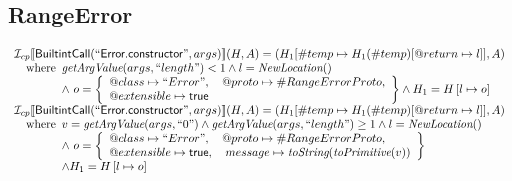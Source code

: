 \subsection{RangeError}
\[
\begin{array}{l}
\mathcal{I} _{cp}\llbracket \mbox{\textsf{BuiltintCall}}(``\mbox{\textsf{Error.constructor}}",args)\rrbracket(H,A)
  = (H_1[\#temp \mapsto H_1(\#temp)[@return \mapsto l]], A)\\
\quad{\rm where}\begin{array}[t]{l}
  \emph{getArgValue}(args, ``length") < 1 
  \land l=\emph{NewLocation}()\\
  \land\ o = \left\{\begin{array}{l}
    @class\mapsto ``Error", \quad
    @proto\mapsto \#RangeErrorProto,\\
    @extensible\mapsto \mbox{\textsf{true}}
    \end{array}\right\}
  \land H_1=H\left[l\mapsto o\right]\\
  \end{array}\\
  
\mathcal{I} _{cp}\llbracket \mbox{\textsf{BuiltintCall}}(``\mbox{\textsf{Error.constructor}}",args)\rrbracket(H,A)
  = (H_1[\#temp \mapsto H_1(\#temp)[@return \mapsto l]], A)\\
\quad{\rm where}\begin{array}[t]{l}
  v = \emph{getArgValue}(args, ``0") \land \emph{getArgValue}(args, ``length") \geq 1
  \land l=\emph{NewLocation}()\\
  \land\ o = \left\{\begin{array}{l}
    @class\mapsto ``Error", \quad
    @proto\mapsto \#RangeErrorProto,\\
    @extensible\mapsto \mbox{\textsf{true}},  \quad
    message \mapsto \emph{toString}(\emph{toPrimitive}(v)) 
    \end{array}\right\}\\
  \land H_1=H\left[l\mapsto o\right]
  \end{array}\\

\end{array}
\]



